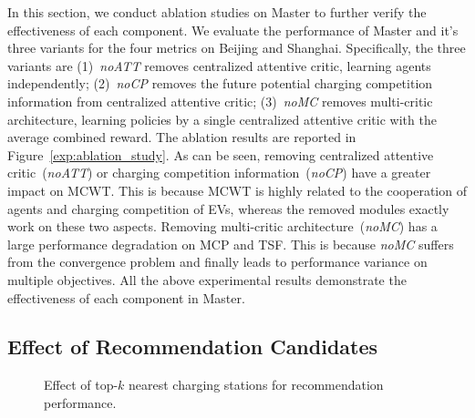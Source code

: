 \documentclass[sigconf]{acmart}
\newcommand{\beijing}{{\sc Beijing}\xspace}
\newcommand{\shanghai}{{\sc Shanghai}\xspace}
\newcommand{\stddpg}{{\sc Master}\xspace}
\newcommand\figref[1]{Figure~\ref{#1}}
\begin{document}
In this section, we conduct ablation studies on \stddpg to further verify the effectiveness of each component. We evaluate the performance of \stddpg and it's three variants for the four metrics on \beijing and \shanghai. Specifically, the three variants are (1)~\emph{noATT} removes centralized attentive critic, learning agents independently;
(2)~\emph{noCP} removes the future potential charging competition information from centralized attentive critic;
(3)~\emph{noMC} removes multi-critic architecture, learning policies by a single centralized attentive critic with the average combined reward. The ablation results are reported in \figref{exp:ablation_study}. As can be seen, removing centralized attentive critic~(\emph{noATT}) or charging competition information~(\emph{noCP}) have a greater impact on MCWT. This is because MCWT is highly related to the cooperation of agents and charging competition of EVs, whereas the removed modules exactly work on these two aspects. Removing multi-critic architecture~(\emph{noMC}) has a large performance degradation on MCP and TSF. This is because \emph{noMC} suffers from the convergence problem and finally leads to performance variance on multiple objectives.
All the above experimental results demonstrate the effectiveness of each component in \stddpg.


\subsection{Effect of Recommendation Candidates}
\begin{figure}[tb]
\centering
\vspace{-1.25mm}
\caption{Effect of top-$k$ nearest charging stations for recommendation performance.}
\label{exp:topk}
\end{figure} 
\end{document}
